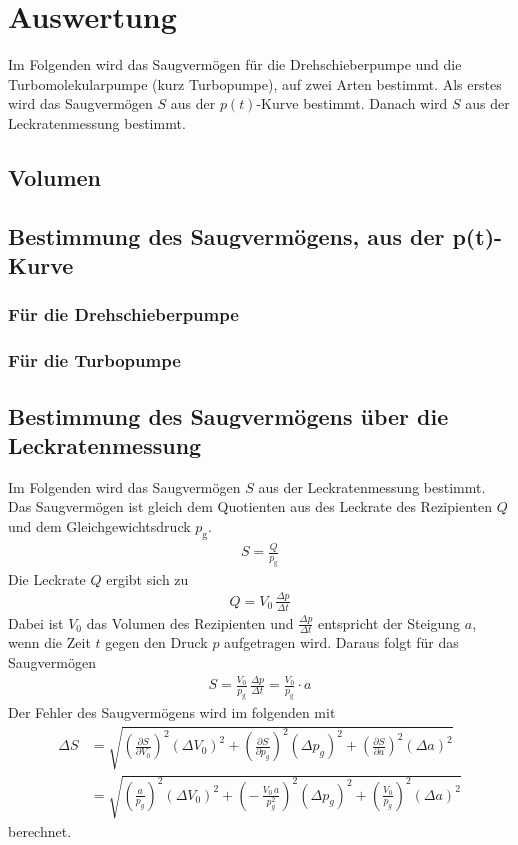 \section{Auswertung}
\label{sec:Auswertung}
Im Folgenden wird das Saugvermögen für die Drehschieberpumpe und die Turbomolekularpumpe (kurz Turbopumpe), auf zwei Arten bestimmt. Als erstes wird das Saugvermögen $S$ aus der $p(t)$-Kurve bestimmt. Danach wird $S$ aus der Leckratenmessung bestimmt.


\subsection{Volumen}


\subsection{Bestimmung des Saugvermögens, aus der p(t)-Kurve}
\subsubsection{Für die Drehschieberpumpe}
\subsubsection{Für die Turbopumpe}



\subsection{Bestimmung des Saugvermögens über die Leckratenmessung}
Im Folgenden wird das Saugvermögen $S$ aus der Leckratenmessung bestimmt. Das Saugvermögen ist gleich dem Quotienten aus des Leckrate des Rezipienten $Q$ und dem Gleichgewichtsdruck $p_\text{g}$.
\begin{align}
  S = \frac{Q}{p_\text{g}}
\end{align}
Die Leckrate $Q$ ergibt sich zu
\begin{align}
  Q = V_0\, \frac{\Delta p}{\Delta t}
\end{align}
Dabei ist $V_0$ das Volumen des Rezipienten und $\frac{\Delta p}{\Delta t}$ entspricht der Steigung $a$, wenn die Zeit $t$ gegen den Druck $p$ aufgetragen wird. Daraus folgt für das Saugvermögen
\begin{align}\label{eqn:SaugLeck}
  S = \frac{V_0}{p_\text{g}}\, \frac{\Delta p}{\Delta t} = \frac{V_0}{p_\text{g}} \cdot a
\end{align}
Der Fehler des Saugvermögens wird im folgenden mit
\begin{align*}
  \Delta S &= \sqrt{ \left(\frac{\partial S}{\partial V_0} \right)^2 (\Delta V_0)^2 + \left(\frac{\partial S}{\partial p_g} \right)^2 (\Delta p_g)^2 + \left(\frac{\partial S}{\partial a} \right)^2 (\Delta a)^2 } \\
  &= \sqrt{ \left(\frac{a}{p_g} \right)^2 (\Delta V_0)^2 + \left(-\,\frac{V_0\,a}{p_g^2} \right)^2 (\Delta p_g)^2 + \left(\frac{V_0}{p_g} \right)^2 (\Delta a)^2 }
\end{align*}
berechnet.



